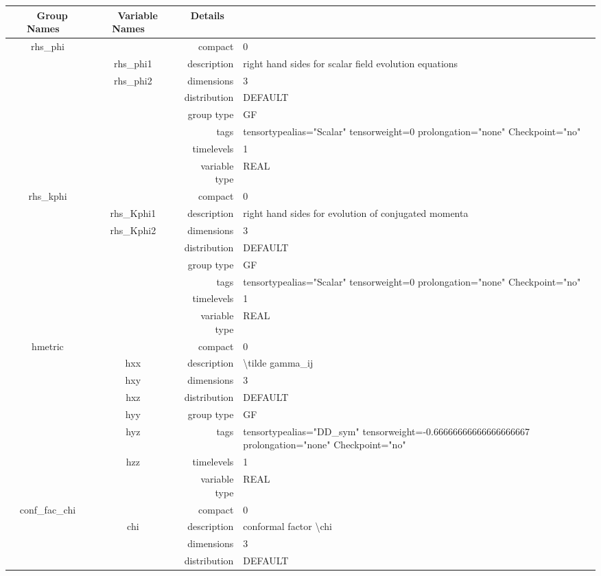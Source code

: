 \begin{tabular*}{150mm}{|c|c@{\extracolsep{\fill}}|rl|} \hline 
~ {\bf Group Names} ~ & ~ {\bf Variable Names} ~  &{\bf Details} ~ & ~\\ 
\hline 
rhs\_phi &  & compact & 0 \\ 
 & rhs\_phi1 & description & right hand sides for scalar field evolution equations \\ 
 & rhs\_phi2 & dimensions & 3 \\ 
 &  & distribution & DEFAULT \\ 
 &  & group type & GF \\ 
 &  & tags & tensortypealias="Scalar" tensorweight=0 prolongation="none" Checkpoint="no" \\ 
 &  & timelevels & 1 \\ 
 &  & variable type & REAL \\ 
\hline 
rhs\_kphi &  & compact & 0 \\ 
 & rhs\_Kphi1 & description & right hand sides for evolution of conjugated momenta \\ 
 & rhs\_Kphi2 & dimensions & 3 \\ 
 &  & distribution & DEFAULT \\ 
 &  & group type & GF \\ 
 &  & tags & tensortypealias="Scalar" tensorweight=0 prolongation="none" Checkpoint="no" \\ 
 &  & timelevels & 1 \\ 
 &  & variable type & REAL \\ 
\hline 
hmetric &  & compact & 0 \\ 
 & hxx & description & {\textbackslash}tilde gamma\_ij \\ 
 & hxy & dimensions & 3 \\ 
 & hxz & distribution & DEFAULT \\ 
 & hyy & group type & GF \\ 
 & hyz & tags & tensortypealias="DD\_sym" tensorweight=-0.66666666666666666667 prolongation="none" Checkpoint="no" \\ 
 & hzz & timelevels & 1 \\ 
 &  & variable type & REAL \\ 
\hline 
conf\_fac\_chi &  & compact & 0 \\ 
 & chi & description & conformal factor {\textbackslash}chi \\ 
 &  & dimensions & 3 \\ 
 &  & distribution & DEFAULT \\ 

\end{tabular*}
